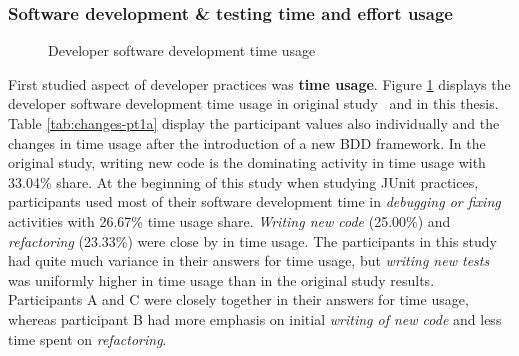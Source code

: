 \subsubsection{Software development \& testing time and effort usage}
    \begin{figure}[ht]%
        \centering
        \qquad
        \caption{Developer software development time usage}%
        \label{fig:time-usage}%
    \end{figure}
First studied aspect of developer practices was \textbf{time usage}. Figure \ref{fig:time-usage} displays the developer software development time usage
in original study~\cite{daka2014survey} and in this thesis. Table \ref{tab:changes-pt1a} display the participant values
also individually and the changes in time usage after the introduction of a new BDD framework. In the original study, writing
new code is the dominating activity in time usage with 33.04\% share. At the beginning of this study when studying JUnit practices,
participants used most of their software development
time in \textit{debugging or fixing} activities with 26.67\% time usage share. \textit{Writing new code} (25.00\%) and \textit{refactoring} (23.33\%) were close
by in time usage. The participants in this study had quite much variance in their answers for time usage, but \textit{writing
new tests} was uniformly higher in time usage than in the original study results. Participants A and C
were closely together in their answers for time usage, whereas participant B had more emphasis on initial \textit{writing of new code} and
less time spent on \textit{refactoring}.

